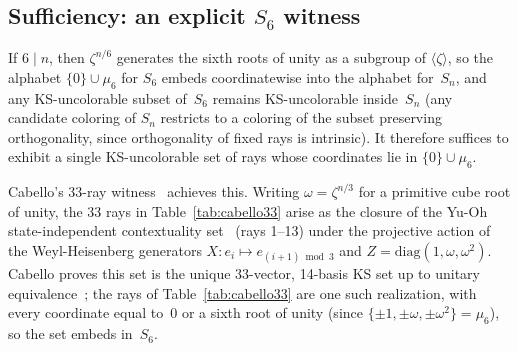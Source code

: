 \documentclass[twocolumn,prl,superscriptaddress,nofootinbib]{revtex4-2}
\begin{document}
\subsection{Sufficiency: an explicit $S_6$ witness}

If $6 \mid n$, then $\zeta^{n/6}$ generates the sixth roots of unity as a subgroup of $\langle\zeta\rangle$, so the alphabet $\{0\} \cup \mu_6$ for $S_6$ embeds coordinatewise into the alphabet for~$S_n$, and any KS-uncolorable subset of~$S_6$ remains KS-uncolorable inside~$S_n$ (any candidate coloring of $S_n$ restricts to a coloring of the subset preserving orthogonality, since orthogonality of fixed rays is intrinsic).  It therefore suffices to exhibit a single KS-uncolorable set of rays whose coordinates lie in $\{0\} \cup \mu_6$.

Cabello's 33-ray witness~\cite{Cabello2025simplest} achieves this.  Writing $\omega = \zeta^{n/3}$ for a primitive cube root of unity, the 33 rays in Table~\ref{tab:cabello33} arise as the closure of the Yu-Oh state-independent contextuality set~\cite{YuOh2012} (rays 1--13) under the projective action of the Weyl-Heisenberg generators $X : e_i \mapsto e_{(i+1) \bmod 3}$ and $Z = \mathrm{diag}(1, \omega, \omega^2)$.  Cabello proves this set is the unique 33-vector, 14-basis KS set up to unitary equivalence~\cite{Cabello2025simplest}; the rays of Table~\ref{tab:cabello33} are one such realization, with every coordinate equal to~$0$ or a sixth root of unity (since $\{\pm 1, \pm\omega, \pm\omega^2\} = \mu_6$), so the set embeds in~$S_6$.
\end{document}
